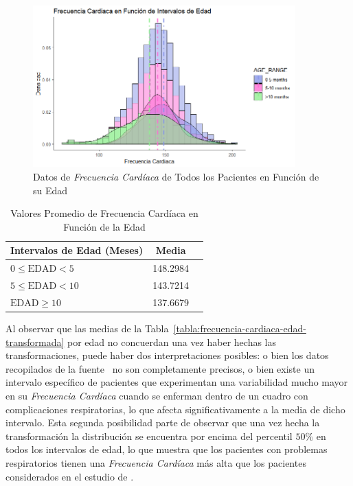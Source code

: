 \begin{figure}[H]
    \centering
    \includegraphics[width=0.9\textwidth]{img/frecuencia-cardiaca-edad.png}
    \caption{Datos de \textit{Frecuencia Cardíaca} de Todos los Pacientes en Función de su Edad}
    \label{fig:frecuencia-cardiaca-edad}
\end{figure}

\begin{table}[H]
    \centering
    \begin{tabular}{lcc}
        \toprule
        \textbf{Intervalos de Edad (Meses)} & \textbf{Media} \\
        \midrule
        $0 \leq \text{EDAD} < 5$ & 148.2984 \\
        $5 \leq \text{EDAD} < 10$ & 143.7214 \\
        $\text{EDAD} \geq 10$ & 137.6679 \\
        \bottomrule
    \end{tabular}
    \caption{Valores Promedio de Frecuencia Cardíaca en Función de la Edad}
    \label{tabla:frecuencia-cardiaca-edad}
\end{table}

Al observar que las medias de la Tabla~\ref{tabla:frecuencia-cardiaca-edad-transformada} por edad no concuerdan una vez haber hechas las transformaciones, puede haber dos interpretaciones posibles: o bien los datos recopilados de la fuente~\cite{percentilesFenton2015} no son completamente precisos, o bien existe un intervalo específico de pacientes que experimentan una variabilidad mucho mayor en su \textit{Frecuencia Cardíaca} cuando se enferman dentro de un cuadro con complicaciones respiratorias, lo que afecta significativamente a la media de dicho intervalo. Esta segunda posibilidad parte de observar que una vez hecha la transformación la distribución se encuentra por encima del percentil $50\%$ en todos los intervalos de edad, lo que muestra que los pacientes con problemas respiratorios tienen una \textit{Frecuencia Cardíaca} más alta que los pacientes considerados en el estudio de \cite{percentilesFenton2015}.

